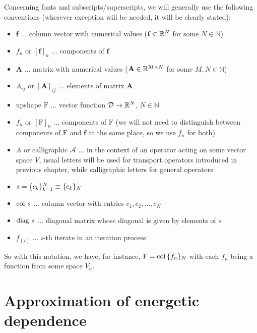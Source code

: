 Concerning fonts and subscripts/superscripts, we will generally use the following conventions (wherever exception will
be needed, it will be clearly stated):
\begin{itemize}
  \item $\mathbf{f}$ $\ldots$ column vector with numerical values ($\mathbf{f}\in\R[N]$ for some $N\in\mathbb{N}$)
  \item $f_n$ or $[\mathbf{f}]_n$ $\ldots$ components of $\mathbf{f}$
  \item $\mathbf{A}$ $\ldots$ matrix with numerical values ($\mathbf{A}\in\R[M\times N]$ for some $M,N\in\mathbb{N}$)
  \item $A_{ij}$ or $[\mathbf{A}]_{ij}$ $\ldots$ elements of matrix $\mathbf{A}$
  \item upshape $\mathrm{F}$ $\ldots$ vector function $\VV\to\R[N]$, $N\in\mathbb{N}$ 
  \item $f_n$ or $[\mathrm{F}]_n$ $\ldots$ components of $\mathrm{F}$ (we will not need to distinguish between
  components of $\mathrm{F}$ and $\mathbf{f}$ at the same place, so we use $f_n$ for both)
  \item $A$ or calligraphic $\mathcal{A}$ $\ldots$ in the context of an operator acting on some vector space $V$, usual
  letters will be used for transport operators introduced in previous chapter, while calligraphic letters for general  
  operators
  \item $s = \{c_k\}_{k=1}^N \equiv \{c_k\}_\idxset{N}$
  \item $\col s$ $\ldots$ column vector with entries $c_1,c_2,\ldots,c_N$
  \item $\diag s$ $\ldots$ diagonal matrix whose diagonal is given by elements of $s$
  \item $f_{(i)}$ $\ldots$ $i$-th iterate in an iteration process
\end{itemize}
So with this notation, we have, for instance, $\mathrm{F} = \col \{f_n\}_N$ with each $f_n$ being a function from some
space $V_n$.

\section{Approximation of energetic dependence}\label{sec:MG}

